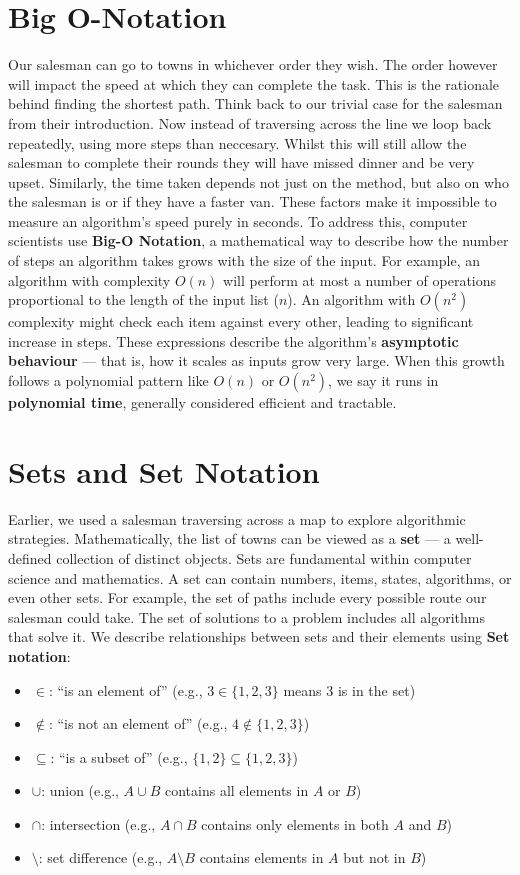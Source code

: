 \documentclass[12pt]{report}
\begin{document}
\section{Big O-Notation}
Our salesman can go to towns in whichever order they wish.
The order however will impact the speed at which they can complete the task.
This is the rationale behind finding the shortest path.
Think back to our trivial case for the salesman from their introduction.
Now instead of traversing across the line we loop back repeatedly, using more steps than neccesary.
Whilst this will still allow the salesman to complete their rounds they will have missed dinner and be very upset.
Similarly, the time taken depends not just on the method, but also on who the salesman is or if they have a faster van.
These factors make it impossible to measure an algorithm's speed purely in seconds.
To address this, computer scientists use \textbf{Big-O Notation}, a mathematical way to describe how the number of steps an algorithm takes grows with the size of the input.
For example, an algorithm with complexity $O(n)$ will perform at most a number of operations proportional to the length of the input list ($n$).
An algorithm with $O(n^2)$ complexity might check each item against every other, leading to significant increase in steps.
These expressions describe the algorithm's \textbf{asymptotic behaviour} --- that is, how it scales as inputs grow very large.
When this growth follows a polynomial pattern like $O(n)$ or $O(n^2)$, we say it runs in \textbf{polynomial time}, generally considered efficient and tractable.

\section{Sets and Set Notation}
Earlier, we used a salesman traversing across a map to explore algorithmic strategies.
Mathematically, the list of towns can be viewed as a \textbf{set} --- a well-defined collection of distinct objects.
Sets are fundamental within computer science and mathematics.
A set can contain numbers, items, states, algorithms, or even other sets.
For example, the set of paths include every possible route our salesman could take.
The set of solutions to a problem includes all algorithms that solve it.
We describe relationships between sets and their elements using \textbf{Set notation}:
\begin{itemize}
    \item $\in$: “is an element of” (e.g., $3 \in \{1, 2, 3\}$ means 3 is in the set)
    \item $\notin$: “is not an element of” (e.g., $4 \notin \{1, 2, 3\}$)
    \item $\subseteq$: “is a subset of” (e.g., $\{1,2\} \subseteq \{1,2,3\}$)
    \item $\cup$: union (e.g., $A \cup B$ contains all elements in $A$ or $B$)
    \item $\cap$: intersection (e.g., $A \cap B$ contains only elements in both $A$ and $B$)
    \item $\setminus$: set difference (e.g., $A \setminus B$ contains elements in $A$ but not in $B$)
\end{itemize}
\end{document}
